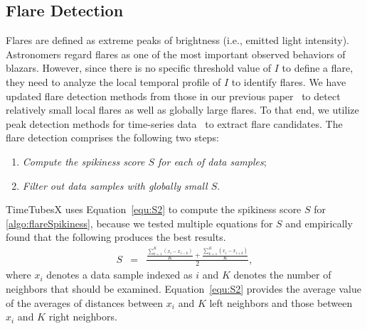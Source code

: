 \subsection{Flare Detection}\label{sec:flareDetection}
Flares are defined as extreme peaks of brightness (i.e., emitted light intensity). 
Astronomers regard flares as one of the most important observed behaviors of blazars.
However, since there is no specific threshold value of $I$ to define a flare, 
they need to analyze the local temporal profile of $I$ to identify flares.
We have updated flare detection methods from those in our previous paper~\cite{Sawada2018}
to detect relatively small local flares as well as globally large flares.
To that end, we utilize peak detection methods for time-series data~\cite{Palshikar2009} to extract flare candidates. 
The flare detection comprises the following two steps:
\begin{enumerate}[nosep, label=\textsl{Step \arabic*}, align=parleft, leftmargin=*]
    \item \textsl{Compute the spikiness score $S$ for each of data samples}; \label{algo:flareSpikiness}
    \item \textsl{Filter out data samples with globally small $S$}. \label{algo:flareFilter}
\end{enumerate}
TimeTubesX uses Equation~\ref{equ:S2} to compute the spikiness score $S$ for \ref{algo:flareSpikiness},
because we tested multiple equations for $S$ and empirically found that the following produces the best results.
\begin{eqnarray}
    S &=& \frac{\frac{\sum_{k=1}^{K}(x_i - x_{i - k})}{K} + \frac{\sum_{k=1}^{K}(x_i - x_{i + k})}{K}}{2}\label{equ:S2},
\end{eqnarray}
where $x_i$ denotes a data sample indexed as $i$ and $K$ denotes the number of neighbors that should be examined.
Equation~\ref{equ:S2} provides the average value of the averages of distances between $x_i$ and $K$ left neighbors and those between $x_i$ and $K$ right neighbors.
